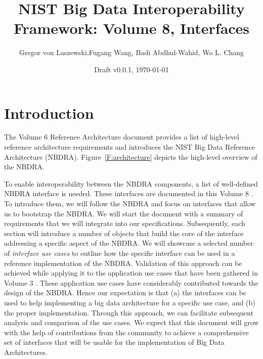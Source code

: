 \documentclass[10pt]{article}
\title{NIST Big Data Interoperability Framework: Volume 8, Interfaces}
\author{Gregor von Laszewski,Fugang Wang, Badi Abdhul-Wahid, 
        Wo L. Chang}
\date{Draft v0.0.1, \today}
\begin{document}



\flushbottom %




\newpage

\linenumbers
\section{Introduction}

The Volume 6 Reference Architecture document \cite{nist-vol-6}
provides a list of high-level reference architecture requirements and
introduces the NIST Big Data Reference Architecture (NBDRA).
Figure~\ref{F:architecture} depicts the high-level overview of the
NBDRA.

To enable interoperability between the NBDRA components, a list of
well-defined NBDRA interface is needed. These interfaces are
documented in this Volume 8 \cite{nist-vol-8}. To introduce them, we
will follow the NBDRA and focus on interfaces that allow us to
bootstrap the NBDRA. We will start the document with a summary of
requirements that we will integrate into our specifications.
Subsequently, each section will introduce a number of objects that
build the core of the interface addressing a specific aspect of the
NBDRA. We will showcase a selected number of {\it interface use cases}
to outline how the specific interface can be used in a reference
implementation of the NBDRA. Validation of this approach can be
achieved while applying it to the application use cases that have been
gathered in Volume 3 \cite{nist-vol-3}. These application use cases
have considerably contributed towards the design of the NBDRA. Hence
our expectation is that (a) the interfaces can be used to help
implementing a big data architecture for a specific use case, and (b)
the proper implementation. Through this approach, we can facilitate
subsequent analysis and comparison of the use cases. We expect that
this document will grow with the help of contributions from the
community to achieve a comprehensive set of interfaces that will be
usable for the implementation of Big Data Architectures.
\end{document}
